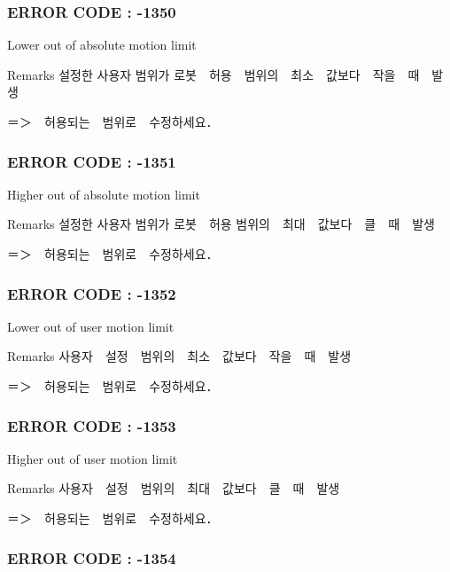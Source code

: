  \subsubsection*{E\-R\-R\-O\-R C\-O\-D\-E \-: -\/1350 }

Lower out of absolute motion limit \begin{DoxyRemark}{Remarks}
설정한 사용자 범위가 로봇　허용　범위의　최소　값보다　작을　때　발생 \par
 ＝＞　허용되는　범위로　수정하세요．
\end{DoxyRemark}


 \subsubsection*{E\-R\-R\-O\-R C\-O\-D\-E \-: -\/1351 }

Higher out of absolute motion limit \begin{DoxyRemark}{Remarks}
설정한 사용자 범위가 로봇　허용 범위의　최대　값보다　클　때　발생 \par
 ＝＞　허용되는　범위로　수정하세요．
\end{DoxyRemark}


 \subsubsection*{E\-R\-R\-O\-R C\-O\-D\-E \-: -\/1352 }

Lower out of user motion limit \begin{DoxyRemark}{Remarks}
사용자　설정　범위의　최소　값보다　작을　때　발생 \par
 ＝＞　허용되는　범위로　수정하세요．
\end{DoxyRemark}


 \subsubsection*{E\-R\-R\-O\-R C\-O\-D\-E \-: -\/1353 }

Higher out of user motion limit \begin{DoxyRemark}{Remarks}
사용자　설정　범위의　최대　값보다　클　때　발생 \par
 ＝＞　허용되는　범위로　수정하세요．
\end{DoxyRemark}


 \subsubsection*{E\-R\-R\-O\-R C\-O\-D\-E \-: -\/1354 }

